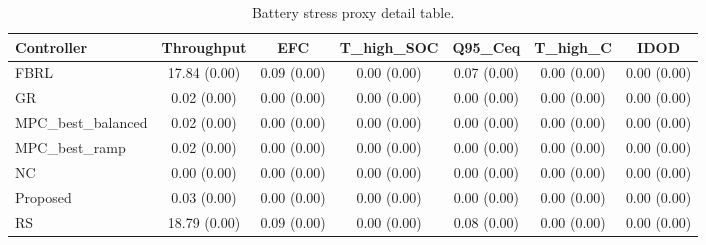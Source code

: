 \begin{table}[t]
\centering
\caption{Battery stress proxy detail table.}
\label{tab:stress_proxy_auto}
\begin{tabular}{lcccccc}
\toprule
Controller & Throughput & EFC & T\_high\_SOC & Q95\_Ceq & T\_high\_C & IDOD \\
\midrule
FBRL & 17.84 (0.00) & 0.09 (0.00) & 0.00 (0.00) & 0.07 (0.00) & 0.00 (0.00) & 0.00 (0.00) \\
GR & 0.02 (0.00) & 0.00 (0.00) & 0.00 (0.00) & 0.00 (0.00) & 0.00 (0.00) & 0.00 (0.00) \\
MPC\_best\_balanced & 0.02 (0.00) & 0.00 (0.00) & 0.00 (0.00) & 0.00 (0.00) & 0.00 (0.00) & 0.00 (0.00) \\
MPC\_best\_ramp & 0.02 (0.00) & 0.00 (0.00) & 0.00 (0.00) & 0.00 (0.00) & 0.00 (0.00) & 0.00 (0.00) \\
NC & 0.00 (0.00) & 0.00 (0.00) & 0.00 (0.00) & 0.00 (0.00) & 0.00 (0.00) & 0.00 (0.00) \\
Proposed & 0.03 (0.00) & 0.00 (0.00) & 0.00 (0.00) & 0.00 (0.00) & 0.00 (0.00) & 0.00 (0.00) \\
RS & 18.79 (0.00) & 0.09 (0.00) & 0.00 (0.00) & 0.08 (0.00) & 0.00 (0.00) & 0.00 (0.00) \\
\bottomrule
\end{tabular}
\end{table}